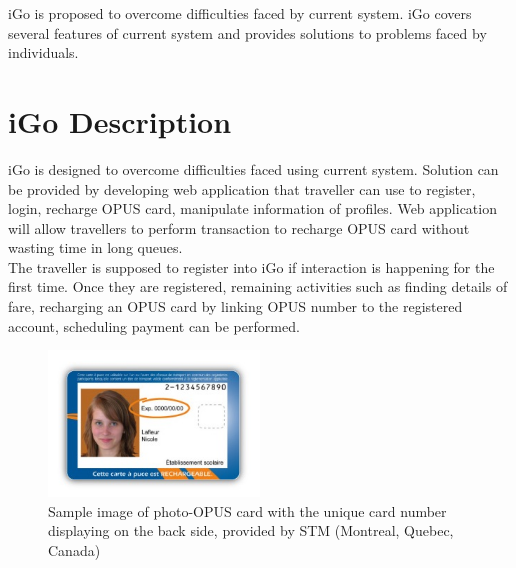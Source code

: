 \documentclass[11pt, english]{report}
\begin{document}
iGo is proposed to overcome difficulties faced by current system. iGo covers several features of current system and provides solutions to problems faced by individuals.


\section{iGo Description}
iGo is designed to overcome difficulties faced using current system. Solution can be provided by developing web application that \gls{traveller} can use to register, login, recharge OPUS card, manipulate information of profiles. Web application will allow travellers to perform transaction to recharge OPUS card without wasting time in long queues. \\

The traveller is supposed to register into iGo if interaction is happening for the first time. Once they are registered, remaining activities such as finding details of fare, recharging an OPUS card by linking OPUS number to the registered account, scheduling payment can be performed.\\

\begin{figure}[h!]
  
  \includegraphics[width=0.5\textwidth]{images/opus-back.jpg}
  \centering
  \caption{Sample image of photo-OPUS card with the unique card number displaying on the back side, provided by STM (Montreal, Quebec, Canada)\cite{card_opus}
}
\end{figure}
\end{document}
